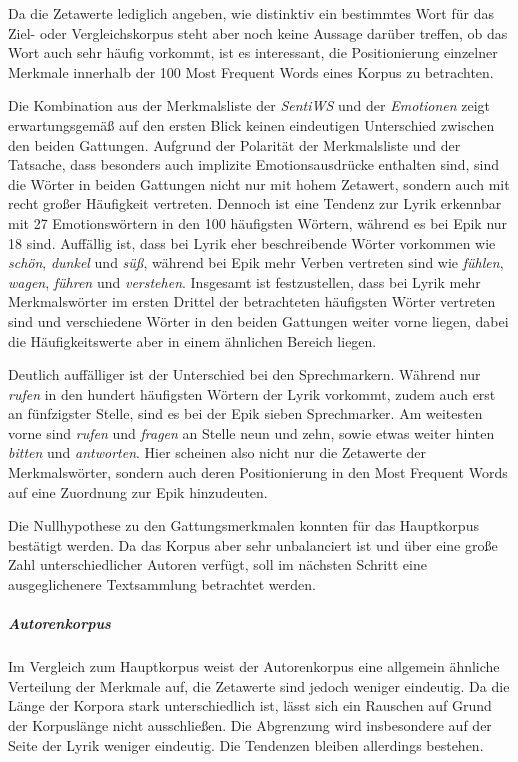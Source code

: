 \documentclass[a4paper,10p]{article}
\begin{document}
Da die Zetawerte lediglich angeben, wie distinktiv ein bestimmtes Wort für das Ziel- oder Vergleichskorpus steht aber noch keine Aussage darüber treffen, ob das Wort auch sehr häufig vorkommt, ist es interessant, die Positionierung einzelner Merkmale innerhalb der 100 Most Frequent Words eines Korpus zu betrachten.\par 

Die Kombination aus der Merkmalsliste der \textit{SentiWS} und der \textit{Emotionen} zeigt erwartungsgemäß auf den ersten Blick keinen eindeutigen Unterschied zwischen den beiden Gattungen. Aufgrund der Polarität der Merkmalsliste und der Tatsache, dass besonders auch implizite Emotionsausdrücke enthalten sind, sind die Wörter in beiden Gattungen nicht nur mit hohem Zetawert, sondern auch mit recht großer Häufigkeit vertreten. Dennoch ist eine Tendenz zur Lyrik erkennbar mit 27 Emotionswörtern in den 100 häufigsten Wörtern, während es bei Epik nur 18 sind. Auffällig ist, dass bei Lyrik eher beschreibende Wörter vorkommen wie \textit{schön}, \textit{dunkel} und \textit{süß}, während bei Epik mehr Verben vertreten sind wie \textit{fühlen}, \textit{wagen}, \textit{führen} und \textit{verstehen}. Insgesamt ist festzustellen, dass bei Lyrik mehr Merkmalswörter im ersten Drittel der betrachteten häufigsten Wörter vertreten sind und verschiedene Wörter in den beiden Gattungen weiter vorne liegen, dabei die Häufigkeitswerte aber in einem ähnlichen Bereich liegen. \par 

Deutlich auffälliger ist der Unterschied bei den Sprechmarkern. Während nur \textit{rufen} in den hundert häufigsten Wörtern der Lyrik vorkommt, zudem auch erst an fünfzigster Stelle, sind es bei der Epik sieben Sprechmarker. Am weitesten vorne sind \textit{rufen} und \textit{fragen} an Stelle neun und zehn, sowie etwas weiter hinten \textit{bitten} und \textit{antworten}. Hier scheinen also nicht nur die Zetawerte der Merkmalswörter, sondern auch deren Positionierung in den Most Frequent Words auf eine Zuordnung zur Epik hinzudeuten. 

Die Nullhypothese zu den Gattungsmerkmalen konnten für das Hauptkorpus bestätigt werden. Da das Korpus aber sehr unbalanciert ist und über eine große Zahl unterschiedlicher Autoren verfügt, soll im nächsten Schritt eine ausgeglichenere Textsammlung betrachtet werden.

\subparagraph{Autorenkorpus} \quad \par 

Im Vergleich zum Hauptkorpus  weist der Autorenkorpus eine allgemein ähn\-lich\-e Verteilung der Merkmale auf, die  Zetawerte sind jedoch weniger eindeutig. Da die Länge der Korpora stark unterschiedlich ist, lässt sich ein Rauschen auf Grund der Korpuslänge nicht ausschließen. Die Abgrenzung wird insbesondere auf der Seite der Lyrik weniger eindeutig. Die Tendenzen bleiben allerdings bestehen. \par 
\end{document}
